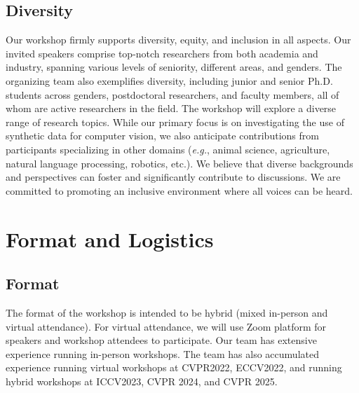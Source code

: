 \documentclass{article}
\begin{document}

\subsection{Diversity}
Our workshop firmly supports diversity, equity, and inclusion in all aspects. Our invited speakers comprise top-notch researchers from both academia and industry, spanning various levels of seniority, different areas, and genders. The organizing team also exemplifies diversity, including junior and senior Ph.D. students across genders, postdoctoral researchers, and faculty members, all of whom are active researchers in the field. The workshop will explore a diverse range of research topics. While our primary focus is on investigating the use of synthetic data for computer vision, we also anticipate contributions from participants specializing in other domains (\emph{e.g.}, animal science, agriculture, natural language processing, robotics, etc.). We believe that diverse backgrounds and perspectives can foster and significantly contribute to discussions. We are committed to promoting an inclusive environment where all voices can be heard.

\section{Format and Logistics}
\subsection{Format}
The format of the workshop is intended to be hybrid (mixed in-person and virtual attendance). For virtual attendance, we will use Zoom platform for speakers and workshop attendees to participate.
Our team has extensive experience running in-person workshops. The team has also accumulated experience running virtual workshops at CVPR2022, ECCV2022, and running hybrid workshops at ICCV2023, CVPR 2024, and CVPR 2025.
\end{document}
